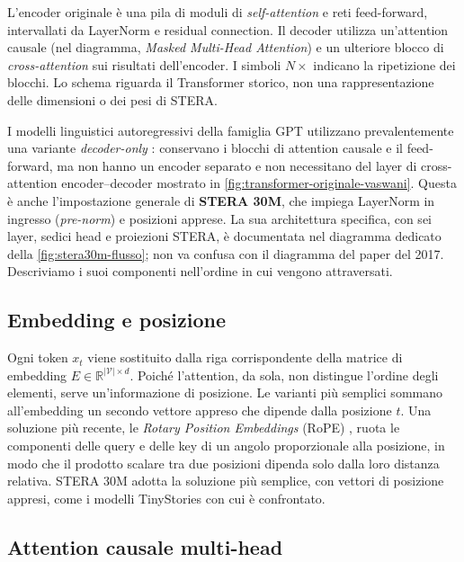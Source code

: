 L'encoder originale è una pila di moduli di \emph{self-attention} e reti feed-forward, intervallati da LayerNorm e residual connection. Il decoder utilizza un'attention causale (nel diagramma, \emph{Masked Multi-Head Attention}) e un ulteriore blocco di \emph{cross-attention} sui risultati dell'encoder. I simboli $N\times$ indicano la ripetizione dei blocchi. Lo schema riguarda il Transformer storico, non una rappresentazione delle dimensioni o dei pesi di STERA.

I modelli linguistici autoregressivi della famiglia GPT utilizzano prevalentemente una variante \emph{decoder-only} \cite{radford2019language}: conservano i blocchi di attention causale e il feed-forward, ma non hanno un encoder separato e non necessitano del layer di cross-attention encoder--decoder mostrato in \autoref{fig:transformer-originale-vaswani}. Questa è anche l'impostazione generale di \textbf{STERA 30M}, che impiega LayerNorm in ingresso (\emph{pre-norm}) e posizioni apprese. La sua architettura specifica, con sei layer, sedici head e proiezioni STERA, è documentata nel diagramma dedicato della \autoref{fig:stera30m-flusso}; non va confusa con il diagramma del paper del 2017. Descriviamo i suoi componenti nell'ordine in cui vengono attraversati.

\subsection{Embedding e posizione}

Ogni token $x_t$ viene sostituito dalla riga corrispondente della matrice di embedding $E\in\mathbb{R}^{|\mathcal{V}|\times d}$. Poiché l'attention, da sola, non distingue l'ordine degli elementi, serve un'informazione di posizione. Le varianti più semplici sommano all'embedding un secondo vettore appreso che dipende dalla posizione $t$. Una soluzione più recente, le \emph{Rotary Position Embeddings} (RoPE) \cite{su2024roformer}, ruota le componenti delle query e delle key di un angolo proporzionale alla posizione, in modo che il prodotto scalare tra due posizioni dipenda solo dalla loro distanza relativa. STERA 30M adotta la soluzione più semplice, con vettori di posizione appresi, come i modelli TinyStories con cui è confrontato.

\subsection{Attention causale multi-head}

